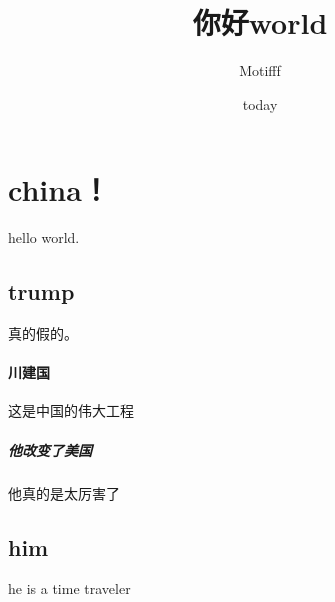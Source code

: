 \documentclass[UTF8]{ctexart}
\title{你好world}
\author{Motifff}
\date{today}
\begin{document}
\maketitle%

\tableofcontents

\section{china！}
    hello world.
\subsection{trump}
    真的假的。
\paragraph{川建国}
    这是中国的伟大工程
\subparagraph{他改变了美国}
    他真的是太厉害了
\subsection{him}
    he is a time traveler
\end{document}
